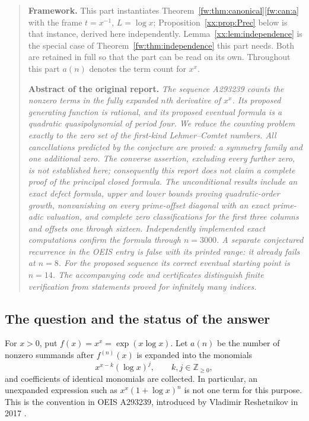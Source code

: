 \documentclass[11pt,a4paper]{article}
\numberwithin{equation}{section}
\theoremstyle{definition}
\theoremstyle{remark}
\theoremstyle{plain}
\newcommand{\Z}{\mathbb Z}
\begin{document}
\begin{quote}\small
\textbf{Framework.}  This part instantiates
Theorem~\ref{fw:thm:canonical}\ref{fw:can:a} with the frame $t=x^{-1}$,
$L=\log x$; Proposition~\ref{xx:prop:Prec} below is that instance, derived here
independently.  Lemma~\ref{xx:lem:independence} is the special case of
Theorem~\ref{fw:thm:independence} this part needs.  Both are retained in full so
that the part can be read on its own.  Throughout this part $a(n)$ denotes the
term count for $x^x$.

\medskip
\textbf{Abstract of the original report.}\itshape
The sequence A293239 counts the nonzero terms in the fully expanded $n$th
derivative of $x^x$. Its proposed generating function is rational, and its
proposed eventual formula is a quadratic quasipolynomial of period four.
We reduce the counting problem exactly to the zero set of the first-kind
Lehmer--Comtet numbers. All cancellations predicted by the conjecture are
proved: a symmetry family and one additional zero. The converse assertion,
excluding every further zero, is not established here; consequently this
report does \upshape\emph{not}\itshape{} claim a complete proof of the principal
closed formula.
The unconditional results include an exact defect formula, upper and lower
bounds proving quadratic-order growth, nonvanishing on every prime-offset
diagonal with an exact prime-adic valuation, and complete zero classifications
for the first three columns and offsets one through sixteen. Independently
implemented exact computations confirm the formula through $n=3000$.
A separate conjectured recurrence in the OEIS entry is false with its printed
range: it already fails at $n=8$. For the proposed sequence its correct
eventual starting point is $n=14$. The accompanying code and certificates
distinguish finite verification from statements proved for infinitely many
indices.
\end{quote}

\subsection{The question and the status of the answer}

For $x>0$, put $f(x)=x^x=\exp(x\log x)$. Let $a(n)$ be the number of nonzero
summands after $f^{(n)}(x)$ is expanded into the monomials
\begin{equation}\label{xx:eq:monomials}
 x^{x-k}(\log x)^j,\qquad k,j\in\Z_{\ge0},
\end{equation}
and coefficients of identical monomials are collected. In particular, an
unexpanded expression such as $x^x(1+\log x)^n$ is not one term for this
purpose. This is the convention in OEIS A293239, introduced by Vladimir
Reshetnikov in 2017 \cite{oeis293239}.
\end{document}
